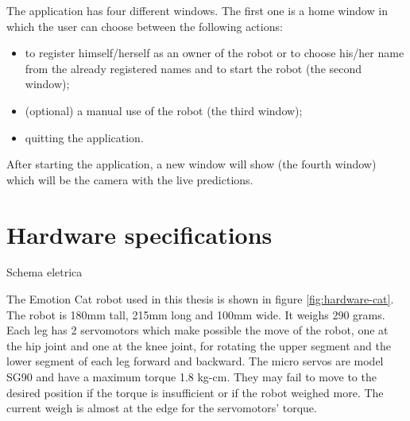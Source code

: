 \documentclass[runningheads,a4paper,12pt]{report}
\begin{document}
The application has four different windows. The first one is a home window in which the user can choose between the following actions:

\begin{itemize}

\item to register himself/herself as an owner of the robot or to choose his/her name from the already registered names and to start the robot (the second window);

\item (optional) a manual use of the robot (the third window);

\item quitting the application.
\end{itemize}

After starting the application, a new window will show (the fourth window) which will be the camera with the live predictions.


\section{Hardware specifications}
Schema eletrica

The Emotion Cat robot used in this thesis is shown in figure \ref{fig:hardware-cat}. The robot is 180mm tall, 215mm long and 100mm wide. It weighs 290 grams. Each leg has 2 servomotors which make possible the move of the robot, one at the hip joint and one at the knee joint, for rotating the upper segment and the lower segment of each leg forward and backward. The micro servos are model SG90 and have a maximum torque 1.8 kg-cm. They may fail to move to the desired position if the torque is insufficient or if the robot weighed more. The current weigh is almost at the edge for the servomotors' torque.
\end{document}
